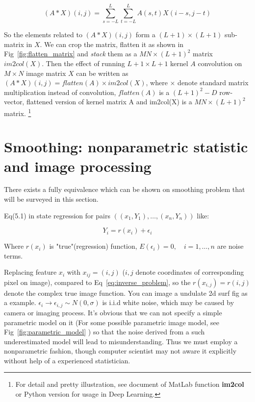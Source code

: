 \documentclass{article}
\begin{document}
$$
(A*X)(i,j) = \sum_{s=-L}^L \sum_{t=-L}^L A(s,t)X(i-s,j-t)
$$

So the elements related to $(A*X)(i,j)$ form a $(L+1)\times (L+1)$ sub-matrix in $X$. 
We can crop the matrix, flatten it as shown in Fig~\ref{fig:flatten_matrix} and \emph{stack} them as a
$MN \times (L+1)^2$ matrix $im2col(X)$. Then the effect of running $L+1 \times L+1$ kernel $A$ convolution on 
$M \times N$ image matrix $X$ can be written as $(A*X)(i,j) = flatten(A) \times im2col(X)$, where $\times$ denote 
standard matrix multiplication instead of convolution, $flatten(A)$ is a $(L+1)^2-D$ row-vector, 
flattened version of kernel matrix A and im2col(X) is a $MN \times (L+1)^2$ matrix.
\footnote{For detail and pretty illustration, 
see document of MatLab function {\bf im2col} or Python version for usage in Deep Learning.} 



 
\section{Smoothing: nonparametric statistic and image processing}

There exists a fully equivalence which can be shown on smoothing problem that will be surveyed in this section.

Eq(5.1) in \cite{wasserman2006all} state regression for pairs $((x_1,Y_1),\dots,(x_n,Y_n))$ like:

$$
Y_i = r(x_i) + \epsilon_i
$$

Where $r(x_i)$ is "true"(regression) function, $E(\epsilon_i) = 0, \quad i=1,\dots,n$ are noise terms.

Replacing feature $x_i$ with $x_{ij}=(i,j)$ ($i,j$ denote coordinates of corresponding pixel on image), 
compared to Eq~\ref{eq:inverse_problem},
so the $r(x_{i,j})=r(i,j)$ denote the complex true image function. 
You can image a undulate 2d surf fig as a example.
$\epsilon_i \to \epsilon_{i,j} \sim N(0,\sigma)$ is i.i.d white noise, 
which may be caused by camera or imaging process.
It's obvious that we can not specify a simple parametric model on it (For some possible parametric image model,
see Fig~\ref{fig:parametric_model} ) 
so that the noise derived from a such underestimated model will lead to misunderstanding. 
Thus we must employ a nonparametric fashion, 
though computer scientist may not aware it explicitly without help of a experienced statistician.
\end{document}
